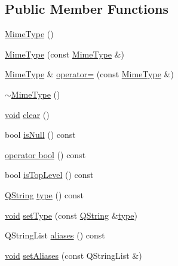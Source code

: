 \subsection*{\-Public \-Member \-Functions}
\begin{DoxyCompactItemize}
\item 
\hyperlink{group___core_plugin_ga4afb222f16010df4252caff7ca264214}{\-Mime\-Type} ()
\item 
\hyperlink{group___core_plugin_gaf3eef4f7d35c3f1cbf9b6531ad29f3f5}{\-Mime\-Type} (const \hyperlink{class_core_1_1_mime_type}{\-Mime\-Type} \&)
\item 
\hyperlink{class_core_1_1_mime_type}{\-Mime\-Type} \& \hyperlink{group___core_plugin_ga885539378c7538653aa56bc48b16ca48}{operator=} (const \hyperlink{class_core_1_1_mime_type}{\-Mime\-Type} \&)
\item 
\hyperlink{group___core_plugin_ga81931045febeb757dcd1fd43fb21d5fc}{$\sim$\-Mime\-Type} ()
\item 
\hyperlink{group___u_a_v_objects_plugin_ga444cf2ff3f0ecbe028adce838d373f5c}{void} \hyperlink{group___core_plugin_gae127b4f4a3fe982f3823c5227dd8d490}{clear} ()
\item 
bool \hyperlink{group___core_plugin_ga3b4f946e2b24082d83336ca0ceb7423c}{is\-Null} () const 
\item 
\hyperlink{group___core_plugin_gae84530ba498b22ef7518b0cfa5ac877a}{operator bool} () const 
\item 
bool \hyperlink{group___core_plugin_ga778820a570e278d33abbabe00e3c703d}{is\-Top\-Level} () const 
\item 
\hyperlink{group___u_a_v_objects_plugin_gab9d252f49c333c94a72f97ce3105a32d}{\-Q\-String} \hyperlink{group___core_plugin_ga4dc87bc5d4687aaa46b634677bdafea5}{type} () const 
\item 
\hyperlink{group___u_a_v_objects_plugin_ga444cf2ff3f0ecbe028adce838d373f5c}{void} \hyperlink{group___core_plugin_ga74d2daccd4e5b7bce1409083a6e0a5f4}{set\-Type} (const \hyperlink{group___u_a_v_objects_plugin_gab9d252f49c333c94a72f97ce3105a32d}{\-Q\-String} \&\hyperlink{group___core_plugin_ga4dc87bc5d4687aaa46b634677bdafea5}{type})
\item 
\-Q\-String\-List \hyperlink{group___core_plugin_gaa725def81555bf9742aa4f1de240e033}{aliases} () const 
\item 
\hyperlink{group___u_a_v_objects_plugin_ga444cf2ff3f0ecbe028adce838d373f5c}{void} \hyperlink{group___core_plugin_ga160b1e636202fba5adfd24ad3925b8e2}{set\-Aliases} (const \-Q\-String\-List \&)
\item 

\end{DoxyCompactItemize}

